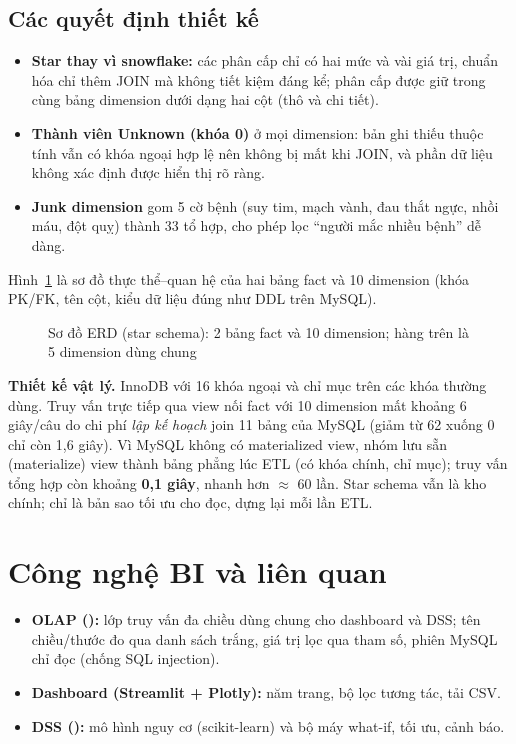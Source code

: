\subsection{Các quyết định thiết kế}
\begin{itemize}
\item \textbf{Star thay vì snowflake:} các phân cấp chỉ có hai mức và vài giá trị, chuẩn hóa chỉ thêm JOIN mà không tiết kiệm đáng kể; phân cấp được giữ trong cùng bảng dimension dưới dạng hai cột (thô và chi tiết).
\item \textbf{Thành viên Unknown (khóa 0)} ở mọi dimension: bản ghi thiếu thuộc tính vẫn có khóa ngoại hợp lệ nên không bị mất khi JOIN, và phần dữ liệu không xác định được hiển thị rõ ràng.
\item \textbf{Junk dimension}  gom 5 cờ bệnh (suy tim, mạch vành, đau thắt ngực, nhồi máu, đột quỵ) thành 33 tổ hợp, cho phép lọc ``người mắc nhiều bệnh'' dễ dàng.
\end{itemize}
Hình~\ref{fig:erd} là sơ đồ thực thể--quan hệ của hai bảng fact và 10 dimension (khóa PK/FK, tên cột, kiểu dữ liệu đúng như DDL trên MySQL).
\begin{landscape}
\begin{figure}[p]
\centering
\resizebox{\linewidth}{!}{}
\caption{Sơ đồ ERD (star schema): 2 bảng fact và 10 dimension; hàng trên là 5 dimension dùng chung}\label{fig:erd}
\end{figure}
\end{landscape}

\textbf{Thiết kế vật lý.} InnoDB với 16 khóa ngoại và chỉ mục trên các khóa thường dùng. Truy vấn trực tiếp qua view nối fact với 10 dimension mất khoảng 6 giây/câu do chi phí \emph{lập kế hoạch} join 11 bảng của MySQL (giảm  từ 62 xuống 0 chỉ còn 1,6 giây). Vì MySQL không có materialized view, nhóm lưu sẵn (materialize) view thành bảng phẳng  lúc ETL (có khóa chính, chỉ mục); truy vấn tổng hợp còn khoảng \textbf{0,1 giây}, nhanh hơn $\approx$ 60 lần. Star schema vẫn là kho chính;  chỉ là bản sao tối ưu cho đọc, dựng lại mỗi lần ETL.

\section{Công nghệ BI và liên quan}
\begin{itemize}
\item \textbf{OLAP ():} lớp truy vấn đa chiều dùng chung cho dashboard và DSS; tên chiều/thước đo qua danh sách trắng, giá trị lọc qua tham số, phiên MySQL chỉ đọc (chống SQL injection).
\item \textbf{Dashboard (Streamlit + Plotly):} năm trang, bộ lọc tương tác, tải CSV.
\item \textbf{DSS ():} mô hình nguy cơ (scikit-learn) và bộ máy what-if, tối ưu, cảnh báo.
\end{itemize}

